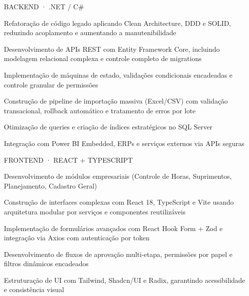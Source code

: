 \documentclass[10pt, a4paper]{article}
\newcommand{\sublabel}[1]{%
	\vspace{4pt}%
	{\monoFont\fontsize{7}{8.5}\selectfont\color{cvgreenmid}%
		\addfontfeatures{LetterSpace=9}\MakeUppercase{#1}}%
	\vspace{1pt}\par%
}
\begin{document}
	\sublabel{Backend · .NET / C\#}
	\begin{cvitems}
		\item {\fontsize{9}{13.5}\selectfont\color{cvgray}Refatoração de código legado aplicando Clean Architecture, DDD e SOLID, reduzindo acoplamento e aumentando a manutenibilidade}
		\item {\fontsize{9}{13.5}\selectfont\color{cvgray}Desenvolvimento de APIs REST com Entity Framework Core, incluindo modelagem relacional complexa e controle completo de migrations}
		\item {\fontsize{9}{13.5}\selectfont\color{cvgray}Implementação de máquinas de estado, validações condicionais encadeadas e controle granular de permissões}
		\item {\fontsize{9}{13.5}\selectfont\color{cvgray}Construção de pipeline de importação massiva (Excel/CSV) com validação transacional, rollback automático e tratamento de erros por lote}
		\item {\fontsize{9}{13.5}\selectfont\color{cvgray}Otimização de queries e criação de índices estratégicos no SQL Server}
		\item {\fontsize{9}{13.5}\selectfont\color{cvgray}Integração com Power BI Embedded, ERPs e serviços externos via APIs seguras}
	\end{cvitems}
	
	\sublabel{Frontend · React + TypeScript}
	\begin{cvitems}
	\item {\fontsize{9}{13.5}\selectfont\color{cvgray}Desenvolvimento de módulos empresariais (Controle de Horas, Suprimentos, Planejamento, Cadastro Geral)}
	\item {\fontsize{9}{13.5}\selectfont\color{cvgray}Construção de interfaces complexas com React 18, TypeScript e Vite usando arquitetura modular por serviços e componentes reutilizáveis}
	\item {\fontsize{9}{13.5}\selectfont\color{cvgray}Implementação de formulários avançados com React Hook Form + Zod e integração via Axios com autenticação por token}
	\item {\fontsize{9}{13.5}\selectfont\color{cvgray}Desenvolvimento de fluxos de aprovação multi-etapa, permissões por papel e filtros dinâmicos encadeados}
	\item {\fontsize{9}{13.5}\selectfont\color{cvgray}Estruturação de UI com Tailwind, Shadcn/UI e Radix, garantindo acessibilidade e consistência visual}
	\end{cvitems}
	
\end{document}
